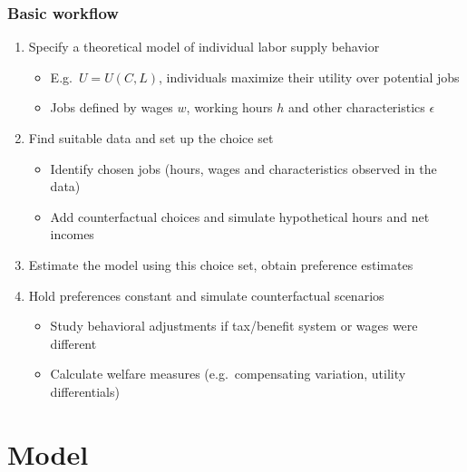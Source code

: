 \documentclass[handout,intlimits]{beamer}
\begin{document}
\begin{frame}
\frametitle{Basic workflow}
\begin{enumerate}
	\item Specify a theoretical model of individual labor supply behavior
	\begin{itemize}
		\item E.g.\ $U=U\left(C,L\right)$, individuals maximize their utility over potential jobs
		\smallskip
		\item Jobs defined by wages $w$, working hours $h$ and other characteristics $\epsilon$
	\end{itemize}
	\bigskip
	\item Find suitable data and set up the choice set
	\begin{itemize}
		\item Identify chosen jobs (hours, wages and characteristics observed in the data)
		\smallskip
		\item Add counterfactual choices and simulate hypothetical hours and net incomes
	\end{itemize}
	\bigskip
	\item Estimate the model using this choice set, obtain preference estimates
	\bigskip
	\item Hold preferences constant and simulate counterfactual scenarios
	\begin{itemize}
		\item Study behavioral adjustments if tax/benefit system or wages were different
		\smallskip
		\item Calculate welfare measures (e.g.\ compensating variation, utility differentials)
	\end{itemize}
\end{enumerate}
\end{frame}


\section{Model}
\end{document}

